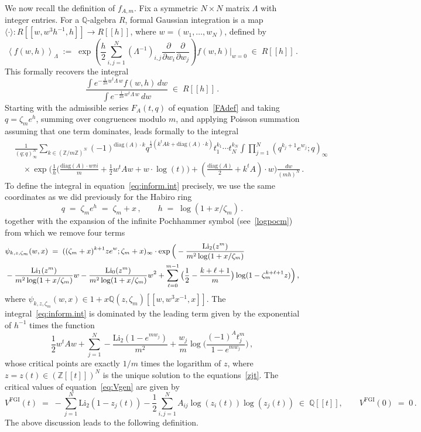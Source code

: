 \documentclass[12pt,reqno]{amsart}
\theoremstyle{definition}
\def\BZ{\mathbb Z}
\def\BQ{\mathbb Q}
\def\Li{\mathrm{Li}}
\def\be{\begin{equation}}
\def\ee{\end{equation}}
\def\z{\zeta}
\def\diag{\mathrm{diag}}
\def\={\;=\;}
\def\inn{\;\in\;}
\def\FGI{\mathrm{FGI}}
\def\Phitof{f}
\begin{document}
We now recall the definition of $\Phitof_{A,m}$. Fix a symmetric $N \times N$ matrix
$\Lambda$ with integer entries. For a $\BQ$-algebra $R$, formal Gaussian integration
is a map $\langle \cdot \rangle: R[\![w,w^3h^{-1},h]\!] \to R[\![ h]\!]$, where
$w=(w_1,\dots,w_N)$, defined by
\be
\label{eq:bracket}
\left\langle
f(w,h)
\right\rangle_{\Lambda}
\;:=\; \exp\left(
{\frac{h}{2}\sum_{i,j=1}^N (\Lambda^{-1})_{i,j}
\frac{\partial}{\partial w_i}
\frac{\partial}{\partial w_j}}\right)
f(w,h) \Big|_{w=0}
\inn R[\![h]\!]\,.
\ee
This formally recovers the integral
\be
\frac{\int e^{-\frac{1}{2h}w^t \Lambda \,w}f(w,h) \, dw}{
\int e^{-\frac{1}{2h}w^t \Lambda \,w} \, dw}
\inn R[\![h]\!]\,.
\ee
Starting with the admissible series $F_{A}(t,q)$ of equation~\eqref{FAdef} and taking
$q=\z_me^{h}$, summing over congruences modulo $m$, and applying Poisson
summation assuming that one term dominates, leads formally to the integral
\be
\label{eq:inform.int}
\begin{aligned}
&\frac{1}{(q;q)_{\infty}^{N}}\sum_{k\in(\BZ/m\BZ)^N}
(-1)^{\mathrm{diag}(A)\cdot k}q^{\frac{1}{2}(k^t A k
+ \mathrm{diag}(A)\cdot k)}t_1^{k_1} \cdots t_{N}^{k_N}
\int \prod_{j=1}^{N}(q^{k_j+1}e^{w_j};q)_{\infty}\\
&\quad\times \exp\Big(\frac{1}{h}\Big(
\frac{\diag(A)\cdot w\pi i}{m}+\frac{1}{2}w^tAw+w\cdot\log(t)\Big)
+(\frac{\diag(A)}{2}+k^{t}A)\cdot w\Big)
\frac{dw}{(mh)^{N}}\,.
\end{aligned}
\ee
To define the integral in equation~\eqref{eq:inform.int} precisely, we use the
same coordinates as we did previously for the Habiro ring 
\be
q\=\z_me^{h}\=\z_m+x\,,\qquad
h\=\log(1+x/\z_m)\,.
\ee
together with the expansion of the infinite Pochhammer symbol (see~\eqref{logpocm}) 
from which we remove four terms
\be
\label{Psikdef}
\begin{small}
\begin{aligned}
&\psi_{k,z,\z_m}(w,x) \= 
((\z_m+x)^{k+1}ze^w;\z_m+x)_{\infty} \cdot 
\exp\Big(-\frac{\Li_{2}(z^{m})}{m^2\log(1+x/\z_m)}\\
&-\frac{\Li_{1}(z^{m})}{m^2\log(1+x/\z_m)} w 
 -\frac{\Li_{0}(z^{m})}{m^2\log(1+x/\z_m)}w^2
+ \sum_{\ell=0}^{m-1}
\big(\frac{1}{2}-\frac{k+\ell+1}{m}\big)\log(1-\z_m^{k+\ell+1}z) \Big)\,,
\end{aligned}
\end{small}
\ee
where $\psi_{k,z,\z_m}(w,x)\in1+x\BQ(z,\z_m)[\![w,w^3x^{-1},x]\!]$.
The integral~\eqref{eq:inform.int} is dominated by the leading term given by
the exponential of $h^{-1}$ times the function
\be
\label{eq:Vgen}
\frac{1}{2}w^tAw +\sum_{j=1}^{N} -\frac{\Li_{2}(1-e^{mw_j})}{m^2}
+\frac{w_j}{m}\log\Big(\frac{(-1)^{A}t_j^m}{1-e^{mw_j}}\Big) \,,
\ee
whose critical points are exactly $1/m$ times the logarithm of $z$, where
$z=z(t)\in (\BZ[\![t]\!])^N$ is the unique solution to the equations~\eqref{zjt}.
The critical values of equation~\eqref{eq:Vgen} are given by
\be 
\label{Vt}
V^\FGI(t) %
\= -\sum_{j=1}^N \Li_2(1-z_j(t))
- \frac{1}{2} \sum_{i,j=1}^N A_{ij} \log(z_i(t))\log(z_j(t)) \inn \BQ[\![t]\!],
\qquad V^\FGI(0)\=0 \,.
\ee
The above discussion leads to the following definition.
\end{document}
